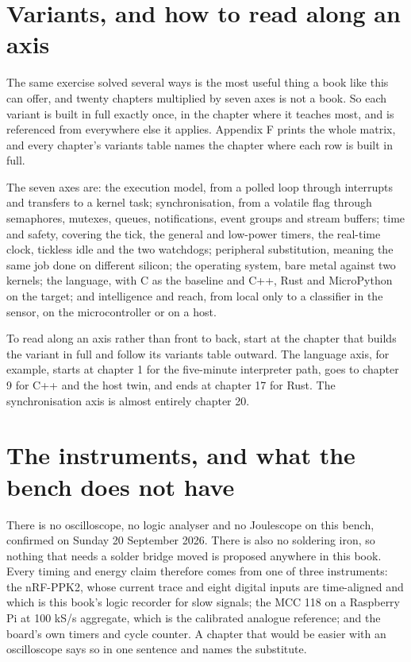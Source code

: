 \section*{Variants, and how to read along an axis}

The same exercise solved several ways is the most useful thing a book like this can offer, and twenty chapters multiplied by seven axes is not a book. So each variant is built in full exactly once, in the chapter where it teaches most, and is referenced from everywhere else it applies. Appendix F prints the whole matrix, and every chapter's variants table names the chapter where each row is built in full.

The seven axes are: the execution model, from a polled loop through interrupts and transfers to a kernel task; synchronisation, from a volatile flag through semaphores, mutexes, queues, notifications, event groups and stream buffers; time and safety, covering the tick, the general and low-power timers, the real-time clock, tickless idle and the two watchdogs; peripheral substitution, meaning the same job done on different silicon; the operating system, bare metal against two kernels; the language, with C as the baseline and C++, Rust and MicroPython on the target; and intelligence and reach, from local only to a classifier in the sensor, on the microcontroller or on a host.

To read along an axis rather than front to back, start at the chapter that builds the variant in full and follow its variants table outward. The language axis, for example, starts at chapter 1 for the five-minute interpreter path, goes to chapter 9 for C++ and the host twin, and ends at chapter 17 for Rust. The synchronisation axis is almost entirely chapter 20.

\section*{The instruments, and what the bench does not have}

There is no oscilloscope, no logic analyser and no Joulescope on this bench, confirmed on Sunday 20 September 2026. There is also no soldering iron, so nothing that needs a solder bridge moved is proposed anywhere in this book. Every timing and energy claim therefore comes from one of three instruments: the nRF-PPK2, whose current trace and eight digital inputs are time-aligned and which is this book's logic recorder for slow signals; the MCC 118 on a Raspberry Pi at 100 kS/s aggregate, which is the calibrated analogue reference; and the board's own timers and cycle counter. A chapter that would be easier with an oscilloscope says so in one sentence and names the substitute.

